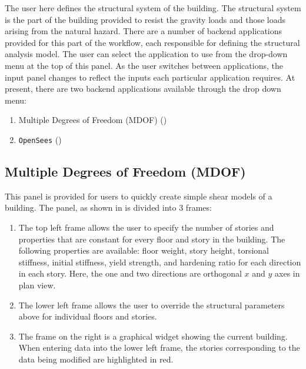 The user here defines the structural system of the
building. The  structural system is the part of the building provided
to resist the gravity loads and those loads arising from the natural hazard. 
There are a number of backend applications provided for this part of the workflow, 
each responsible for defining the structural analysis model. The user can select 
the application to use from the drop-down menu at the top of this panel. As the 
user switches between applications,
the input panel changes to reflect the inputs each particular application requires. At present, there are two backend applications
available through the drop down menu: 

\begin{enumerate}
\item Multiple Degrees of Freedom (MDOF) ()
\item \texttt{OpenSees} ()
\end{enumerate}

\subsection{Multiple Degrees of Freedom (MDOF)}\label{sec:MDOF}

This panel is provided for users to quickly create simple shear models
of a building. The panel, as shown in  is divided
into 3 frames:
\begin{enumerate}
\item The top left frame allows the user to specify the number of stories and properties that are constant for every floor and story in the building. The following properties are available: floor weight, story height, torsional stiffness, initial stiffness, yield strength, and hardening ratio for each direction in each story. Here, the one and two directions are orthogonal $x$ and $y$ axes in plan view.
\item The lower left frame allows the user to override the structural parameters above for individual floors and stories.
\item The frame on the right is a graphical widget showing the current building. When entering data into the lower left frame, the stories corresponding to the data being modified are highlighted in red.
\end{enumerate}

